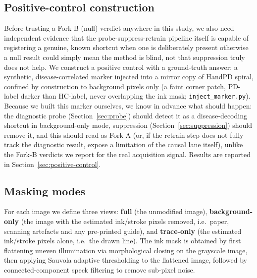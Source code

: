 \documentclass[3p,final,10pt]{elsarticle}
\let\oldsubsection\subsection
\renewcommand{\subsection}{\FloatBarrier\oldsubsection}
\begin{document}
\subsection{Positive-control construction}
\label{sec:positive-control-methods}
Before trusting a Fork-B (null) verdict anywhere in this study, we also
need independent evidence that the probe-suppress-retrain pipeline itself
is capable of registering a genuine, known shortcut when one is
deliberately present otherwise a null result could simply mean the
method is blind, not that suppression truly does not help. We construct a
positive control with a ground-truth answer: a synthetic, disease-correlated
marker injected into a mirror copy of HandPD spiral, confined by
construction to background pixels only (a faint corner patch, PD-label
darker than HC-label, never overlapping the ink mask;
\texttt{inject\_marker.py}). Because we built this marker ourselves, we
know in advance what should happen: the diagnostic probe
(Section~\ref{sec:probe}) should detect it as a disease-decoding shortcut
in background-only mode, suppression (Section~\ref{sec:suppression})
should remove it, and this should read as Fork A (or, if the retrain step
does not fully track the diagnostic result, expose a limitation of the
causal lane itself), unlike the Fork-B verdicts we report for the real
acquisition signal. Results are reported in
Section~\ref{sec:positive-control}.

\subsection{Masking modes}
\label{sec:masking}
For each image we define three views: \textbf{full} (the unmodified image),
\textbf{background-only} (the image with the estimated ink/stroke pixels
removed, i.e.\ paper, scanning artefacts and any pre-printed guide), and
\textbf{trace-only} (the estimated ink/stroke pixels alone, i.e.\ the drawn
line). The ink mask is obtained by first flattening uneven illumination via
morphological closing on the grayscale image, then applying Sauvola
adaptive thresholding to the flattened image, followed by connected-component
speck filtering to remove sub-pixel noise.
\end{document}
